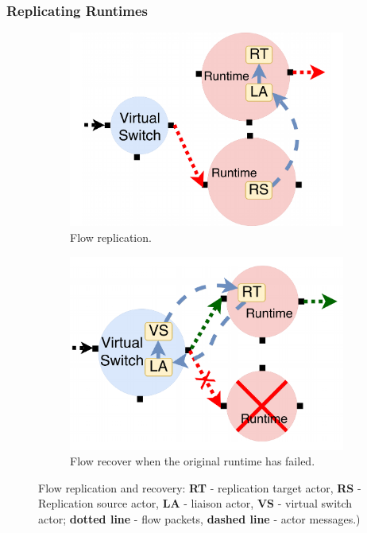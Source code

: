 \subsubsection{Replicating Runtimes}%
\label{sec:replicating-runtime}
\begin{figure}[!t]
\begin{subfigure}[t]{0.49\linewidth}
   \centering
   \includegraphics[width=\columnwidth]{figure/nfactor-replication.pdf}
   \caption{Flow replication.}\label{fig:rep}
  \end{subfigure}
  \begin{subfigure}[t]{0.49\linewidth}
     \centering
     \includegraphics[width=\columnwidth]{figure/nfactor-recover.pdf}
     \caption{Flow recover when the original runtime has failed.}\label{fig:recover}
    \end{subfigure}
 \caption{Flow replication and recovery: \textbf{RT} - replication target actor, \textbf{RS} - Replication source actor, \textbf{LA} - liaison actor, \textbf{VS} - virtual switch actor; \textbf{dotted line} - flow packets, \textbf{dashed line} - actor messages.)}
\label{fig:flow-rep}
\end{figure}

